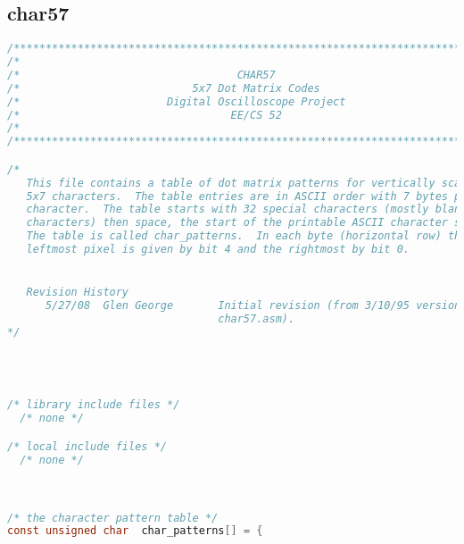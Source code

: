 \subsection{char57}
\begin{lstlisting}[language=C]
/****************************************************************************/
/*                                                                          */
/*                                  CHAR57                                  */
/*                           5x7 Dot Matrix Codes                           */
/*                       Digital Oscilloscope Project                       */
/*                                 EE/CS 52                                 */
/*                                                                          */
/****************************************************************************/

/*
   This file contains a table of dot matrix patterns for vertically scanned
   5x7 characters.  The table entries are in ASCII order with 7 bytes per 
   character.  The table starts with 32 special characters (mostly blank
   characters) then space, the start of the printable ASCII character set.
   The table is called char_patterns.  In each byte (horizontal row) the
   leftmost pixel is given by bit 4 and the rightmost by bit 0.


   Revision History
      5/27/08  Glen George       Initial revision (from 3/10/95 version of
                                 char57.asm).
*/




/* library include files */
  /* none */

/* local include files */
  /* none */



/* the character pattern table */
const unsigned char  char_patterns[] = {


\end{lstlisting}

